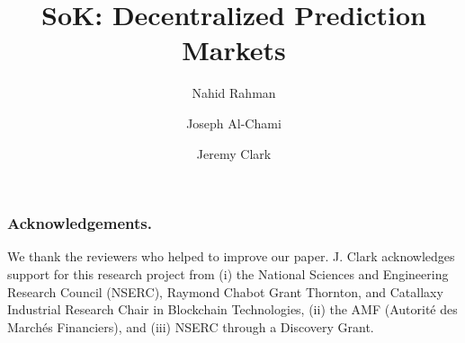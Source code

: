\documentclass[runningheads]{llncs}
\begin{document}
\title{ SoK: Decentralized Prediction Markets}

\author{
	Nahid Rahman \and 
	Joseph Al-Chami \and 
	Jeremy Clark
	}

	

\maketitle









\subsubsection*{Acknowledgements.} We thank the reviewers who helped to improve our paper. J. Clark acknowledges support for this research project from (i) the National Sciences and Engineering Research Council (NSERC), Raymond Chabot Grant Thornton, and Catallaxy Industrial Research Chair in Blockchain Technologies, (ii) the AMF (Autorité des Marchés Financiers), and (iii) NSERC through a Discovery Grant. 





\clearpage
\appendix


\end{document}
